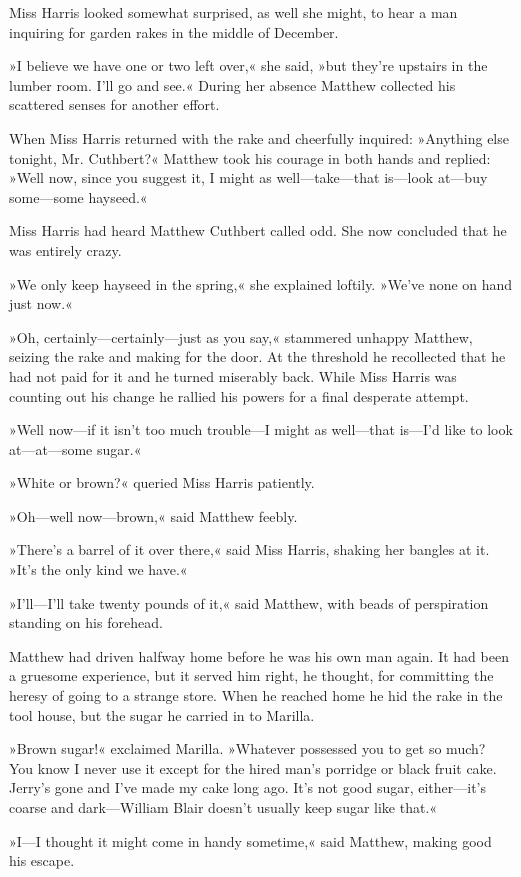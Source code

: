 Miss Harris looked somewhat surprised, as well she might, to hear a man inquiring for garden rakes in the middle of December.

»I believe we have one or two left over,« she said, »but they’re upstairs in the lumber room. I’ll go and see.« During her absence Matthew collected his scattered senses for another effort.

When Miss Harris returned with the rake and cheerfully inquired: »Anything else tonight, Mr. Cuthbert?« Matthew took his courage in both hands and replied: »Well now, since you suggest it, I might as well—take—that is—look at—buy some—some hayseed.«

Miss Harris had heard Matthew Cuthbert called odd. She now concluded that he was entirely crazy.

»We only keep hayseed in the spring,« she explained loftily. »We’ve none on hand just now.«

»Oh, certainly—certainly—just as you say,« stammered unhappy Matthew, seizing the rake and making for the door. At the threshold he recollected that he had not paid for it and he turned miserably back. While Miss Harris was counting out his change he rallied his powers for a final desperate attempt.

»Well now—if it isn’t too much trouble—I might as well—that is—I’d like to look at—at—some sugar.«

»White or brown?« queried Miss Harris patiently.

»Oh—well now—brown,« said Matthew feebly.

»There’s a barrel of it over there,« said Miss Harris, shaking her bangles at it. »It’s the only kind we have.«

»I’ll—I’ll take twenty pounds of it,« said Matthew, with beads of perspiration standing on his forehead.

Matthew had driven halfway home before he was his own man again. It had been a gruesome experience, but it served him right, he thought, for committing the heresy of going to a strange store. When he reached home he hid the rake in the tool house, but the sugar he carried in to Marilla.

»Brown sugar!« exclaimed Marilla. »Whatever possessed you to get so much? You know I never use it except for the hired man’s porridge or black fruit cake. Jerry’s gone and I’ve made my cake long ago. It’s not good sugar, either—it’s coarse and dark—William Blair doesn’t usually keep sugar like that.«

»I—I thought it might come in handy sometime,« said Matthew, making good his escape.

